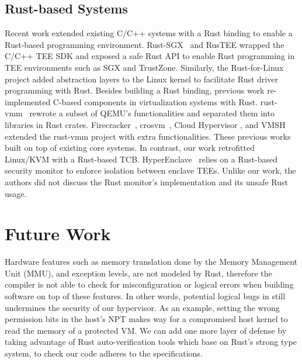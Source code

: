 \subsection{Rust-based Systems}
Recent work extended existing C/C++ systems with a Rust binding to enable
a Rust-based programming environment. Rust-SGX~\cite{rustsgx} and RusTEE
\cite{rustee} wrapped the C/C++ TEE SDK and exposed a safe Rust API
to enable Rust programming in TEE environments such as SGX and TrustZone.
Similarly, the Rust-for-Linux~\cite{Rust-for-Linux} project added
abstraction layers to the Linux kernel to facilitate Rust driver
programming with Rust.
Besides building a Rust binding, previous work re-implemented C-based
components in virtualization systems with Rust.
rust-vmm~\cite{rust-vmm} rewrote a subset of QEMU's functionalities
and separated them into libraries in Rust crates.
Firecracker~\cite{Firecracker}, crosvm~\cite{crosvm}, Cloud Hypervisor
\cite{CloudHypervisor}, and VMSH~\cite{VMSH} extended the
rust-vmm project with extra functionalities. These previous works
built on top of existing core systems. In contrast, our work
retrofitted Linux/KVM with a Rust-based TCB.
HyperEnclave~\cite{hyperenclave} relies on a Rust-based security
monitor to enforce isolation between enclave TEEs. Unlike
our work, the authors did not discuss the Rust monitor's implementation
and its unsafe Rust usage.

\section{Future Work}

Hardware features such as memory translation done by the Memory Management
Unit (MMU), and exception levels, are not modeled by Rust, therefore the
compiler is not able to check for misconfiguration or logical errors when
building software on top of these features.
In other words, potential logical bugs in \rustcore{} still undermines the
security of our hypervisor.
As an example, setting the wrong permission bits in the host's NPT
makes way for a compromised host kernel to read the memory of a protected VM.
We can add one more layer of defense by taking advantage of Rust
auto-verification tools \cite{Verus, Prusti, Creusot, Flux} which base on
Rust's strong type system, to check our code adheres to the specifications.

